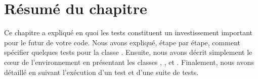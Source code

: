 \documentclass[a4paper,10pt,twoside]{book}
\begin{document}
{%



\section{Résumé du chapitre}

Ce chapitre a expliqué en quoi les tests constituent un investissement important pour le futur de votre code.
Nous avons expliqué, étape par étape, comment spécifier quelques tests pour la classe .
Ensuite, nous avons décrit simplement le c{\oe}ur de l'environnement \sunit en présentant les 
classes , ,  et . Finalement, nous avons 
détaillé \sunit en suivant l'exécution d'un test et d'une suite de tests.

}
\end{document}
